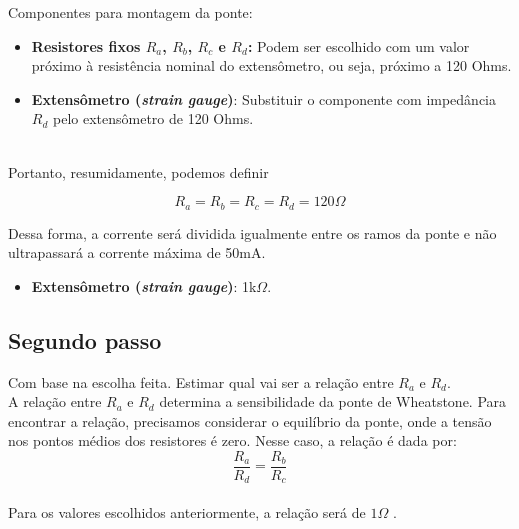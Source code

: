 \documentclass[a4paper, 12pt]{article}
\begin{document}
Componentes para montagem da ponte:

\begin{itemize}
    \item \textbf{Resistores fixos $R_a$, $R_b$, $R_c$ e $R_d$: }Podem ser escolhido com um valor próximo à resistência nominal do extensômetro, ou seja, próximo a 120 Ohms.
    \item \textbf{Extensômetro (\textit{strain gauge})}: Substituir o componente com impedância $R_d$ pelo extensômetro de 120 Ohms.
\end{itemize}\\

Portanto, resumidamente, podemos definir

\begin{equation*}
    R_a = R_b = R_c = R_d = 120 \Omega
\end{equation*}

Dessa forma, a corrente será dividida igualmente entre os ramos da ponte e não ultrapassará a corrente máxima de 50mA.


\begin{itemize}
    \item \textbf{Extensômetro (\textit{strain gauge})}: 1k$\Omega$.
\end{itemize}





\newpage
\subsection{Segundo passo}
 Com base na escolha feita. Estimar qual vai ser a relação entre $R_a$ e $R_d$.\\

A relação entre $R_a$ e $R_d$ determina a sensibilidade da ponte de Wheatstone. Para encontrar a relação, precisamos considerar o equilíbrio da ponte, onde a tensão nos pontos médios dos resistores é zero. Nesse caso, a relação é dada por:\\


\begin{equation*}
\frac{R_a}{R_d} = \frac{R_b}{R_c}
\end{equation*}\\

Para os valores escolhidos anteriormente, a relação será de $1 \Omega$ .



\end{document}
